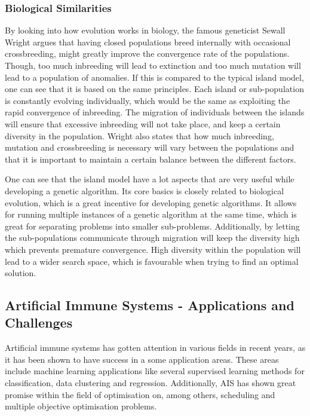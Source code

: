 \subsubsection{Biological Similarities}
By looking into how evolution works in biology, the famous geneticist Sewall Wright \cite{IGA:wright-inbreeding} argues that having closed populations breed internally with occasional crossbreeding, might greatly improve the convergence rate of the populations. Though, too much inbreeding will lead to extinction and too much mutation will lead to a population of anomalies. If this is compared to the typical island model, one can see that it is based on the same principles. Each island or sub-population is constantly evolving individually, which would be the same as exploiting the rapid convergence of inbreeding. The migration of individuals between the islands will ensure that excessive inbreeding will not take place, and keep a certain diversity in the population. Wright also states that how much inbreeding, mutation and crossbreeding is necessary will vary between the populations and that it is important to maintain a certain balance between the different factors.

One can see that the island model have a lot aspects that are very useful while developing a genetic algorithm. Its core basics is closely related to biological evolution, which is a great incentive for developing genetic algorithms. It allows for running multiple instances of a genetic algorithm at the same time, which is great for separating problems into smaller sub-problems. Additionally, by letting the sub-populations communicate through migration will keep the diversity high which prevents premature convergence. High diversity within the population will lead to a wider search space, which is favourable when trying to find an optimal solution. 


\subsection{Artificial Immune Systems - Applications and Challenges}
\label{sec:motivation_ais}
Artificial immune systems has gotten attention in various fields in recent years, as it has been shown to have success in a some application areas. These areas include machine learning applications like several supervised learning methods for classification, data clustering and regression. Additionally, AIS has shown great promise within the field of optimisation on, among others, scheduling and multiple objective optimisation problems. 
